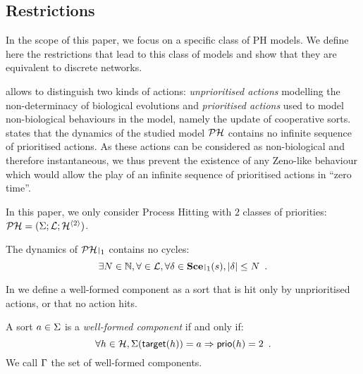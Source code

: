 \label{ssec:hypothesis}
\subsection{Restrictions} %

In the scope of this paper, we focus on a specific class of PH models.
We define here the restrictions that lead to this class of models and show that they are equivalent to discrete networks.

 allows to distinguish two kinds of actions:
\emph{unprioritised actions} modelling the non-determinacy of biological evolutions
and \emph{prioritised actions} used to model non-biological behaviours in the model, namely the update of cooperative sorts.
 states that the dynamics of the studied model $\mathcal{PH}$ contains no infinite sequence of prioritised actions.
As these actions can be considered as non-biological and therefore instantaneous, we thus prevent the existence of any Zeno-like behaviour
which would allow the play of an infinite sequence of prioritised actions in “zero time”.
\begin{criterion}[2 priorities]
\label{cr:2prio}
  In this paper, we only consider Process Hitting with $2$ classes of priorities:
  $\mathcal{PH} = (\Sigma; \mathcal{L}; \mathcal{H}^{\langle 2 \rangle})$.
\end{criterion}
%
\begin{criterion}
\label{cr:bounded}
  The dynamics of $\restriction{\PH}{1}$ contains no cycles:
  $$\exists N \in \sN, \forall \in \PHl, \forall \delta \in \restriction{\Sce}{1}(s), |\delta| \leq N \enspace.$$
\end{criterion}

In  we define a well-formed component as a sort that is hit only by unprioritised actions, or that no action hits.
\begin{definition}
\label{def:component}
  A sort $a \in \Sigma$ is a \emph{well-formed component} if and only if:
  $$\forall h \in \mathcal{H}, \Sigma(\mathsf{target}(h)) = a \Rightarrow \mathsf{prio}(h) = 2 \enspace.$$
  We call $\Gamma$ the set of well-formed components.
\end{definition}


